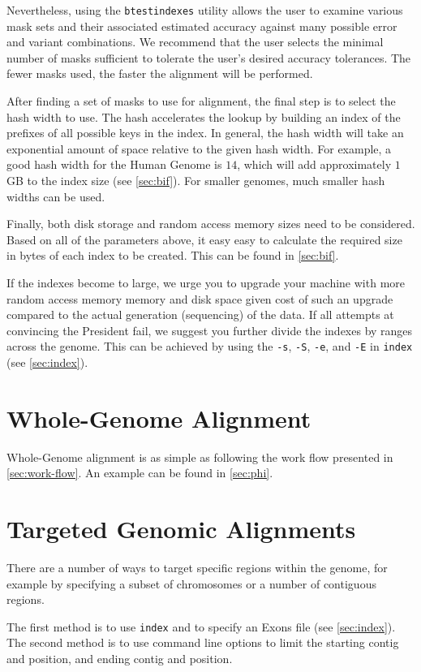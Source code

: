 \documentclass[a4paper,12pt]{book}
\newcommand{\TT}[1]{{\tt #1}} %
\begin{document}
Nevertheless, using the \TT{btestindexes} utility allows the user to examine various mask sets and their associated estimated accuracy against many possible error and variant combinations.
We recommend that the user selects the minimal number of masks sufficient to tolerate the user's desired accuracy tolerances.
The fewer masks used, the faster the alignment will be performed.

After finding a set of masks to use for alignment, the final step is to select the hash width to use. 
The hash accelerates the lookup by building an index of the prefixes of all possible keys in the index.
In general, the hash width will take an exponential amount of space relative to the given hash width.
For example, a good hash width for the Human Genome is $14$, which will add approximately $1$GB to the index size (see \autoref{sec:bif}).
For smaller genomes, much smaller hash widths can be used.

Finally, both disk storage and random access memory sizes need to be considered.  
Based on all of the parameters above, it easy easy to calculate the required size in bytes of each index to be created.
This can be found in \autoref{sec:bif}.

If the indexes become to large, we urge you to upgrade your machine with more random access memory memory and disk space given cost of such an upgrade compared to the actual generation (sequencing) of the data.
If all attempts at convincing the President fail, we suggest you further divide the indexes by ranges across the genome.
This can be achieved by using the \TT{-s}, \TT{-S}, \TT{-e}, and \TT{-E} in \TT{index} (see \autoref{sec:index}).

\section{Whole-Genome Alignment}
\label{sec:whole-genome-alignment}
Whole-Genome alignment is as simple as following the work flow presented in \autoref{sec:work-flow}.
An example can be found in \autoref{sec:phi}.
\section{Targeted Genomic Alignments}
\label{sec:targeted-genomic-alignments}
There are a number of ways to target specific regions within the genome, for example by specifying a subset of chromosomes or a number of contiguous regions.

The first method is to use \TT{index} and to specify an Exons file (see \autoref{sec:index}).
The second method is to use command line options to limit the starting contig and position, and ending contig and position.
\end{document}
